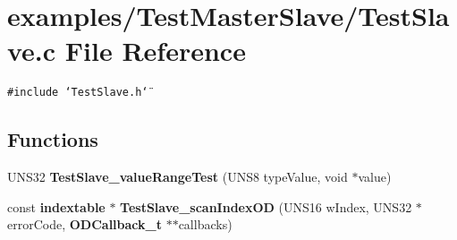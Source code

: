 \section{examples/Test\-Master\-Slave/Test\-Slave.c File Reference}
\label{TestSlave_8c}
{\tt \#include \char`\"{}Test\-Slave.h\char`\"{}}\par
\subsection*{Functions}
\begin{CompactItemize}
\item 
UNS32 {\bf Test\-Slave\_\-value\-Range\-Test} (UNS8 type\-Value, void $\ast$value)
\item 
const {\bf indextable} $\ast$ {\bf Test\-Slave\_\-scan\-Index\-OD} (UNS16 w\-Index, UNS32 $\ast$error\-Code, {\bf ODCallback\_\-t} $\ast$$\ast$callbacks)
\end{CompactItemize}
